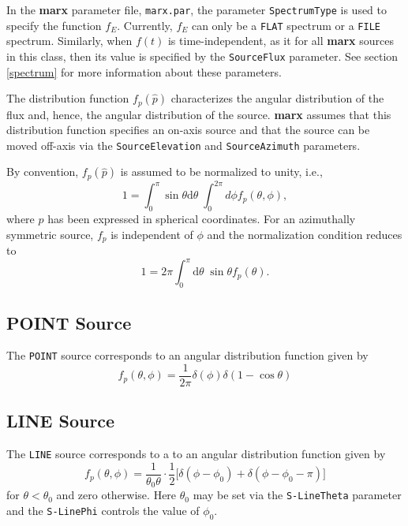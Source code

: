 \documentclass{article}
\newcommand{\p}{\hat{p}}
\newcommand{\marx}{{\bf marx}}
\renewcommand{\d}[1]{\mbox{d}#1\;}
\begin{document}
 In the \marx{} parameter file, \verb|marx.par|, the parameter
 \verb|SpectrumType| is used to specify the function $f_E$. Currently,
 $f_E$ can only be a \verb|FLAT| spectrum or a \verb|FILE| spectrum.
 Similarly, when $f(t)$ is time-independent, as it for all \marx{}
 sources in this class, then its value is specified by the
 \verb|SourceFlux| parameter.  See section \ref{spectrum} for more
 information about these parameters.

 The distribution function $f_p(\p)$ characterizes the angular
 distribution of the flux and, hence, the angular distribution of the
 source.  \marx{} assumes that this distribution function specifies an
 on-axis source and that the source can be moved off-axis via the
 \verb|SourceElevation| and \verb|SourceAzimuth| parameters.

 By convention, $f_p(\p)$ is assumed to be normalized to unity, i.e.,
\begin{equation}
  1 = \int_{0}^{\pi} \sin\theta \d{\theta}
      \int_0^{2\pi} d{\phi} f_p(\theta, \phi) ,
\end{equation}
 where $\p$ has been expressed in spherical coordinates.  For an
 azimuthally symmetric source, $f_p$ is independent of $\phi$ and 
 the normalization condition reduces to
\begin{equation}
  1 = 2\pi \int_{0}^{\pi} \d{\theta} \sin\theta  f_p(\theta) .
\end{equation}

\subsection{POINT Source}

 The \verb|POINT| source corresponds to an angular distribution
 function given by
\begin{equation} 
    f_p(\theta, \phi) = \frac{1}{2\pi} \delta (\phi) 
      \delta(1 - \cos \theta)
\end{equation}
 
\subsection{LINE Source}
 The \verb|LINE| source corresponds to a to an angular distribution
 function given by
\begin{equation}
  f_p(\theta, \phi) = \frac{1}{\theta_0\theta}\cdot
     \frac{1}{2} \big[\delta(\phi - \phi_0) 
          + \delta(\phi - \phi_0 - \pi) \big]
\end{equation}
 for $\theta < \theta_0$ and zero otherwise.  Here $\theta_0$ may be
 set via the \verb|S-LineTheta| parameter and the \verb|S-LinePhi|
 controls the value of $\phi_0$.
\end{document}
